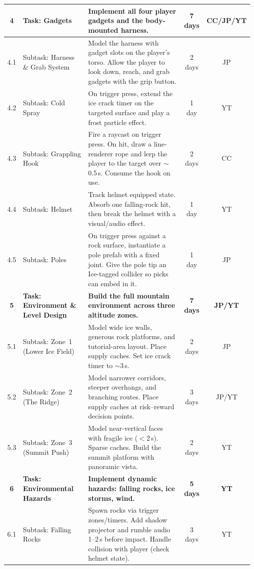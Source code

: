 \documentclass[12pt]{article}
\begin{document}
\begin{longtable}{|c|p{2.8cm}|p{7.2cm}|c|c|}
\hline
\textbf{4} & \textbf{Task: Gadgets} & \textbf{Implement all four player gadgets and the body-mounted harness.} & \textbf{7 days} & \textbf{CC/JP/YT} \\
\hline
4.1 & Subtask: Harness \& Grab System & Model the harness with gadget slots on the player's torso. Allow the player to look down, reach, and grab gadgets with the grip button. & 2 days & JP \\
\hline
4.2 & Subtask: Cold Spray & On trigger press, extend the ice crack timer on the targeted surface and play a frost particle effect. & 1 day & YT \\
\hline
4.3 & Subtask: Grappling Hook & Fire a raycast on trigger press. On hit, draw a line-renderer rope and lerp the player to the target over $\sim$0.5\,s. Consume the hook on use. & 2 days & CC \\
\hline
4.4 & Subtask: Helmet & Track helmet equipped state. Absorb one falling-rock hit, then break the helmet with a visual/audio effect. & 1 day & YT \\
\hline
4.5 & Subtask: Poles & On trigger press against a rock surface, instantiate a pole prefab with a fixed joint. Give the pole tip an Ice-tagged collider so picks can embed in it. & 1 day & JP \\
\hline
\textbf{5} & \textbf{Task: Environment \& Level Design} & \textbf{Build the full mountain environment across three altitude zones.} & \textbf{7 days} & \textbf{JP/YT} \\
\hline
5.1 & Subtask: Zone~1 (Lower Ice Field) & Model wide ice walls, generous rock platforms, and tutorial-area layout. Place supply caches. Set ice crack timer to $\sim$3\,s. & 2 days & JP \\
\hline
5.2 & Subtask: Zone~2 (The Ridge) & Model narrower corridors, steeper overhangs, and branching routes. Place supply caches at risk--reward decision points. & 3 days & JP/YT \\
\hline
5.3 & Subtask: Zone~3 (Summit Push) & Model near-vertical faces with fragile ice ($<$2\,s). Sparse caches. Build the summit platform with panoramic vista. & 2 days & YT \\
\hline
\textbf{6} & \textbf{Task: Environmental Hazards} & \textbf{Implement dynamic hazards: falling rocks, ice storms, wind.} & \textbf{5 days} & \textbf{YT} \\
\hline
6.1 & Subtask: Falling Rocks & Spawn rocks via trigger zones/timers. Add shadow projector and rumble audio 1--2\,s before impact. Handle collision with player (check helmet state). & 3 days & YT \\

\end{longtable}
\end{document}
